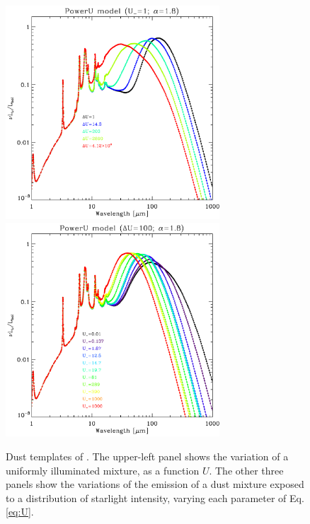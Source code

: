 \documentclass[preprint2,longabstract]{aastex}
\begin{document}
\begin{figure}
\includegraphics[width=80mm]{../Plots/template_powerU_DU_G11_AC.pdf}
\includegraphics[width=80mm]{../Plots/template_powerU_Um_G11_AC.pdf}
\centering
\caption{Dust templates of \cite{galliano11}. The upper-left panel shows the variation of a uniformly illuminated mixture, as a function $U$. The other three panels show the variations of the emission of a dust mixture exposed to a distribution of starlight intensity, varying each parameter of Eq. \ref{eq:U}.  }
\end{figure}
\end{document}

